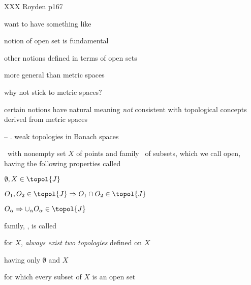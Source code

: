 \documentclass[17pt,landscape]{foils}
\newcommand{\tJ}{\topol{J}}
\begin{document}
{{{\bit
	\item XXX Royden p167
\eit
}{}


%

%

\bit
	\item want to have something like
	\bit
		\item notion of open set is fundamental
		\item other notions defined in terms of open sets
		\item more general than metric spaces
	\eit

	\vitem why not stick to metric spaces?
	\bit
		\item certain notions have natural meaning
			\emph{not} consistent with topological concepts
			derived from metric spaces
		\bit
			\item [--] \eg. weak topologies in Banach spaces
		\eit
	\eit
\eit


%

\bit
	\item {}\ with nonempty set $X$ of points and family \tJ\ of subsets,
		which we call open, having the following properties
		called
	\bit
		\item $\emptyset, X\in\tJ$
		\item $O_1, O_2 \in\tJ \Rightarrow O_1 \cap O_2 \in\tJ$
		\item $O_\alpha \Rightarrow \cup_\alpha O_\alpha \in \tJ$
	\eit

	\vitem family, \tJ, is called %

	\vitem for $X$, \emph{always exist two topologies} defined on $X$
	\bit
		\item {} having only $\emptyset$ and $X$%
		\item {} for which every subset of $X$ is an open set%
	\eit
\eit


}}
\end{document}
